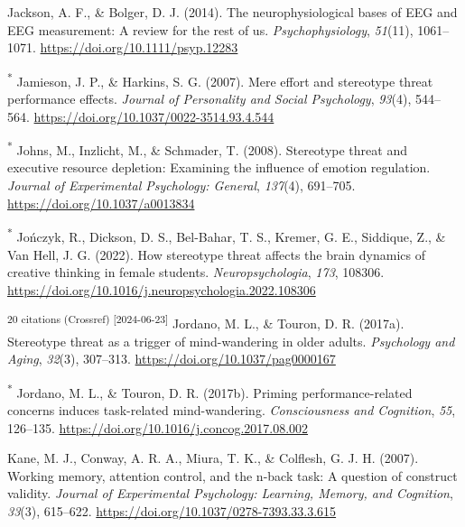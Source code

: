 \documentclass[
  stu, a4paper,floatsintext]{apa7}
\newlength{\cslhangindent}
\newenvironment{CSLReferences}[2] %
 {\begin{list}{}{%
  \setlength{\itemindent}{0pt}
  \setlength{\leftmargin}{0pt}
  \setlength{\parsep}{0pt}
  \ifodd #1
   \setlength{\leftmargin}{\cslhangindent}
   \setlength{\itemindent}{-1\cslhangindent}
  \fi
  \setlength{\itemsep}{#2\baselineskip}}}
 {\end{list}}
\begin{document}
\begin{CSLReferences}{1}{0}
Jackson, A. F., \& Bolger, D. J. (2014). The neurophysiological bases of {\textsc{EEG}} and {\textsc{EEG}} measurement: {A} review for the rest of us. \emph{Psychophysiology}, \emph{51}(11), 1061--1071. \url{https://doi.org/10.1111/psyp.12283}

\textsuperscript{*} Jamieson, J. P., \& Harkins, S. G. (2007). Mere effort and stereotype threat performance effects. \emph{Journal of Personality and Social Psychology}, \emph{93}(4), 544--564. \url{https://doi.org/10.1037/0022-3514.93.4.544}

\textsuperscript{*} Johns, M., Inzlicht, M., \& Schmader, T. (2008). Stereotype threat and executive resource depletion: {Examining} the influence of emotion regulation. \emph{Journal of Experimental Psychology: General}, \emph{137}(4), 691--705. \url{https://doi.org/10.1037/a0013834}

\textsuperscript{*} Jończyk, R., Dickson, D. S., Bel-Bahar, T. S., Kremer, G. E., Siddique, Z., \& Van Hell, J. G. (2022). How stereotype threat affects the brain dynamics of creative thinking in female students. \emph{Neuropsychologia}, \emph{173}, 108306. \url{https://doi.org/10.1016/j.neuropsychologia.2022.108306}

\textsuperscript{20 citations (Crossref) {[}2024-06-23{]}} Jordano, M. L., \& Touron, D. R. (2017a). Stereotype threat as a trigger of mind-wandering in older adults. \emph{Psychology and Aging}, \emph{32}(3), 307--313. \url{https://doi.org/10.1037/pag0000167}

\textsuperscript{*} Jordano, M. L., \& Touron, D. R. (2017b). Priming performance-related concerns induces task-related mind-wandering. \emph{Consciousness and Cognition}, \emph{55}, 126--135. \url{https://doi.org/10.1016/j.concog.2017.08.002}

Kane, M. J., Conway, A. R. A., Miura, T. K., \& Colflesh, G. J. H. (2007). Working memory, attention control, and the n-back task: {A} question of construct validity. \emph{Journal of Experimental Psychology: Learning, Memory, and Cognition}, \emph{33}(3), 615--622. \url{https://doi.org/10.1037/0278-7393.33.3.615}


\end{CSLReferences}
\end{document}
